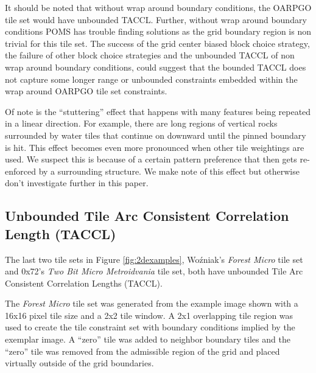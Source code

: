 It should be noted that without wrap around boundary conditions, the OARPGO tile set would have unbounded TACCL.
Further, without wrap around boundary conditions POMS has trouble finding solutions as the
grid boundary region is non trivial for this tile set.
The success of the grid center biased block choice strategy, the failure of other block choice strategies and the unbounded TACCL of
non wrap around boundary conditions, could suggest that the bounded TACCL does not capture some longer range or unbounded constraints
  embedded within the wrap around OARPGO tile set constraints.

Of note is the ``stuttering'' effect that happens with many features being repeated in a linear direction.
For example, there are long regions of vertical rocks surrounded by water tiles that continue on downward until the
pinned boundary is hit.
This effect becomes even more pronounced when other tile weightings are used.
We suspect this is because of a certain pattern preference that then gets re-enforced
by a surrounding structure.
We make note of this effect but otherwise don't investigate further in this paper.

\subsection{Unbounded Tile Arc Consistent Correlation Length (TACCL)}

The last two tile sets in Figure \ref{fig:2dexamples}, Wo\'zniak's \textit{Forest Micro} tile set and 0x72's \textit{Two Bit Micro Metroidvania} tile set,
both have unbounded Tile Arc Consistent Correlation Lengths (TACCL).

The \textit{Forest Micro} tile set was generated from the example image shown with a 16x16 pixel tile size and a 2x2 tile window.
A 2x1 overlapping tile region was used to create the tile constraint set with boundary conditions implied by the exemplar image.
A ``zero'' tile was added to neighbor boundary tiles and the ``zero'' tile was removed from
the admissible region of the grid and placed virtually outside of the grid boundaries.

